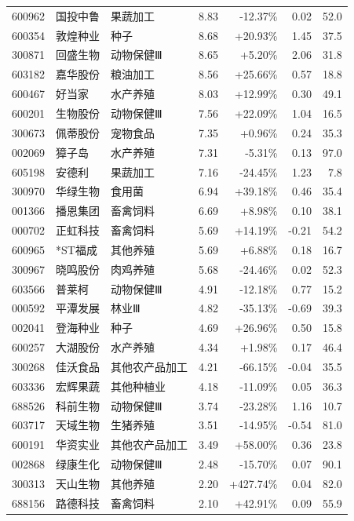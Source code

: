\begin{longtable}{@{}llp{2.4cm}rrrr@{}}
600962 & 国投中鲁 & 果蔬加工 & 8.83 & -12.37\% & 0.02 & 52.0 \\
600354 & 敦煌种业 & 种子 & 8.68 & +20.93\% & 1.45 & 37.5 \\
300871 & 回盛生物 & 动物保健Ⅲ & 8.65 & +5.20\% & 2.06 & 31.8 \\
603182 & 嘉华股份 & 粮油加工 & 8.56 & +25.66\% & 0.57 & 18.8 \\
600467 & 好当家 & 水产养殖 & 8.03 & +12.99\% & 0.30 & 49.1 \\
600201 & 生物股份 & 动物保健Ⅲ & 7.56 & +22.09\% & 1.04 & 16.5 \\
300673 & 佩蒂股份 & 宠物食品 & 7.35 & +0.96\% & 0.24 & 35.3 \\
002069 & 獐子岛 & 水产养殖 & 7.31 & -5.31\% & 0.13 & 97.0 \\
605198 & 安德利 & 果蔬加工 & 7.16 & -24.45\% & 1.23 & 7.8 \\
300970 & 华绿生物 & 食用菌 & 6.94 & +39.18\% & 0.46 & 35.4 \\
001366 & 播恩集团 & 畜禽饲料 & 6.69 & +8.98\% & 0.10 & 38.1 \\
000702 & 正虹科技 & 畜禽饲料 & 5.69 & +14.19\% & -0.21 & 54.2 \\
600965 & *ST福成 & 其他养殖 & 5.69 & +6.88\% & 0.18 & 16.7 \\
300967 & 晓鸣股份 & 肉鸡养殖 & 5.68 & -24.46\% & 0.02 & 52.3 \\
603566 & 普莱柯 & 动物保健Ⅲ & 4.91 & -12.18\% & 0.77 & 15.2 \\
000592 & 平潭发展 & 林业Ⅲ & 4.82 & -35.13\% & -0.69 & 39.3 \\
002041 & 登海种业 & 种子 & 4.69 & +26.96\% & 0.50 & 15.8 \\
600257 & 大湖股份 & 水产养殖 & 4.34 & +1.98\% & 0.17 & 46.4 \\
300268 & 佳沃食品 & 其他农产品加工 & 4.21 & -66.15\% & -0.04 & 35.5 \\
603336 & 宏辉果蔬 & 其他种植业 & 4.18 & -11.09\% & 0.05 & 36.3 \\
688526 & 科前生物 & 动物保健Ⅲ & 3.74 & -23.28\% & 1.16 & 10.7 \\
603717 & 天域生物 & 生猪养殖 & 3.51 & -14.95\% & -0.54 & 81.0 \\
600191 & 华资实业 & 其他农产品加工 & 3.49 & +58.00\% & 0.36 & 23.8 \\
002868 & 绿康生化 & 动物保健Ⅲ & 2.48 & -15.70\% & 0.07 & 90.1 \\
300313 & 天山生物 & 其他养殖 & 2.20 & +427.74\% & 0.04 & 82.0 \\
688156 & 路德科技 & 畜禽饲料 & 2.10 & +42.91\% & 0.09 & 55.9 \\

\end{longtable}
